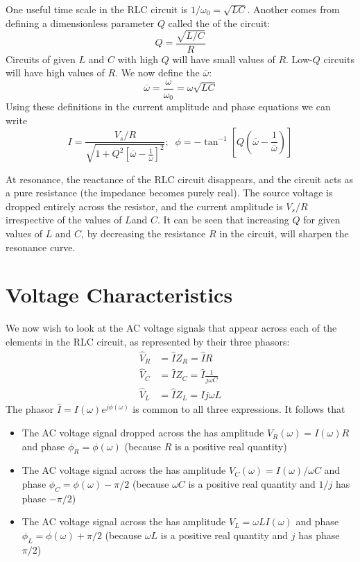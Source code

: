 \documentclass[12pt, a4paper, oneside, openright, titlepage]{book}
\begin{document}
One useful time scale in the RLC circuit is $1/\omega_0 = \sqrt{LC}$. Another comes from defining a dimensionless parameter $Q$ called the  of the circuit: \begin{equation*}
    Q = \frac{\sqrt{L/C}}{R}
\end{equation*}
Circuits of given $L$ and $C$ with high $Q$ will have small values of $R$. Low-$Q$ circuits will have high values of $R$. We now define the  $\overline{\omega}$: \begin{equation*}
    \overline{\omega} = \frac{\omega}{\omega_0} = \omega\sqrt{LC}
\end{equation*}
Using these definitions in the current amplitude and phase equations we can write \begin{equation*}
    I = \frac{V_s/R}{\sqrt{1+Q^2\left[\overline{\omega} - \frac{1}{\overline{\omega}}\right]^2}};\;\;\phi = -\tan^{-1}\left[Q\left(\overline{\omega} - \frac{1}{\overline{\omega}}\right)\right]
\end{equation*}

At resonance, the reactance of the RLC circuit disappears, and the circuit acts as a pure resistance (the impedance becomes purely real). The source voltage is dropped entirely across the resistor, and the current amplitude is $V_s/R$ irrespective of the values of $L$and $C$. It can be seen that increasing $Q$ for given values of $L$ and $C$, by decreasing the resistance $R$ in the circuit, will sharpen the resonance curve. 

\section{Voltage Characteristics}

We now wish to look at the AC voltage signals that appear across each of the elements in the RLC circuit, as represented by their three phasors: \begin{align*}
    \hat{V}_R &= \hat{I}Z_R = \hat{I}R \\
    \hat{V}_C &= \hat{I}Z_C = \hat{I}\frac{1}{j\omega C} \\
    \hat{V}_L &= \hat{I}Z_L = \hat{I}j\omega L
\end{align*}
The phasor $\hat{I} = I(\omega)e^{j\phi(\omega)}$ is common to all three expressions. It follows that \begin{itemize}
    \item The AC voltage signal dropped across the  has amplitude $V_R(\omega) = I(\omega)R$ and phase $\phi_R = \phi(\omega)$ (because $R$ is a positive real quantity)
    \item The AC voltage signal across the  has amplitude $V_C(\omega) = I(\omega)/\omega C$ and phase $\phi_C = \phi(\omega) - \pi/2$ (because $\omega C$ is a positive real quantity and $1/j$ has phase $-\pi/2$)
    \item The AC voltage signal across the  has amplitude $V_L = \omega LI(\omega)$ and phase $\phi_L = \phi(\omega) + \pi/2$ (because $\omega L$ is a positive real quantity and $j$ has phase $\pi/2$)
\end{itemize}
\end{document}
